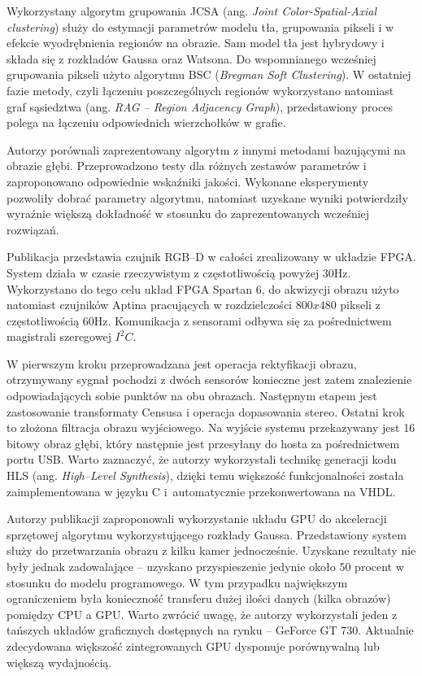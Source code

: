 \documentclass[b5paper,10pt,twoside]{article}
\begin{document}
{Wykorzystany algorytm grupowania JCSA (ang. \textit{Joint Color-Spatial-Axial clustering}) służy do estymacji parametrów modelu tła, grupowania pikseli i w efekcie wyodrębnienia regionów na obrazie. Sam model tła jest hybrydowy i składa się z rozkładów Gaussa oraz Watsona. Do wspomnianego wcześniej grupowania pikseli użyto algorytmu BSC (\textit{Bregman Soft Clustering}). W ostatniej fazie metody, czyli łączeniu poszczególnych regionów wykorzystano natomiast graf sąsiedztwa (ang. \textit{RAG -- Region Adjacency Graph}), przedstawiony proces polega na łączeniu odpowiednich wierzchołków w grafie.

Autorzy porównali zaprezentowany algorytm z innymi metodami bazującymi na obrazie głębi. Przeprowadzono testy dla różnych zestawów parametrów i zaproponowano odpowiednie wskaźniki jakości. Wykonane eksperymenty pozwoliły dobrać parametry algorytmu, natomiast uzyskane wyniki potwierdziły wyraźnie większą dokładność w stosunku do zaprezentowanych wcześniej rozwiązań.

Publikacja \cite{Mattoccia_2015} przedstawia czujnik RGB--D w całości zrealizowany w układzie FPGA. System działa w czasie rzeczywistym z częstotliwością powyżej $30$Hz. Wykorzystano do tego celu układ FPGA Spartan 6, do akwizycji obrazu użyto natomiast czujników Aptina pracujących w rozdzielczości $800x480$ pikseli z częstotliwością $60$Hz. Komunikacja z sensorami odbywa się za pośrednictwem magistrali szeregowej $I^2C$.

W pierwszym kroku przeprowadzana jest operacja rektyfikacji obrazu, otrzymywany sygnał pochodzi z dwóch sensorów konieczne jest zatem znalezienie odpowiadających sobie punktów na obu obrazach. Następnym etapem jest zastosowanie transformaty Censusa i operacja dopasowania stereo. Ostatni krok to złożona filtracja obrazu wyjściowego. Na wyjście systemu przekazywany jest 16 bitowy obraz głębi, który następnie jest przesyłany do hosta za pośrednictwem portu USB. Warto zaznaczyć, że autorzy wykorzystali technikę generacji kodu HLS (ang. \textit{High--Level Synthesis}), dzięki temu większość funkcjonalności została zaimplementowana w języku C i~automatycznie przekonwertowana na VHDL.


Autorzy publikacji \cite{Boghdady_2015} zaproponowali wykorzystanie układu GPU do akceleracji sprzętowej algorytmu wykorzystującego rozkłady Gaussa. Przedstawiony system służy do przetwarzania obrazu z kilku kamer jednocześnie. Uzyskane rezultaty nie były jednak zadowalające -- uzyskano przyspieszenie jedynie około 50 procent w stosunku do modelu programowego. W tym przypadku największym ograniczeniem była konieczność transferu dużej ilości danych (kilka obrazów) pomiędzy CPU a GPU. Warto zwrócić uwagę, że autorzy wykorzystali jeden z tańszych układów graficznych dostępnych na rynku -- GeForce GT 730. Aktualnie zdecydowana większość zintegrowanych GPU dysponuje porównywalną lub większą wydajnością. 

}
\end{document}
